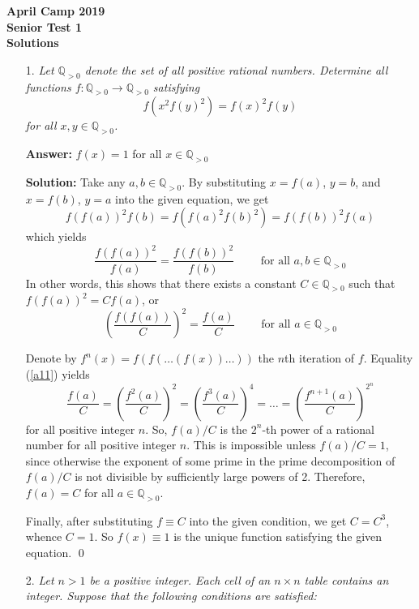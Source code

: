 \documentclass[a4paper, 12pt]{article}
\begin{document}
\begin{center}
\textbf{April Camp 2019 \\ Senior Test 1} \\
\textbf{Solutions}
\end{center}
\vspace{5mm}

\begin{enumerate}

\item[1.]  \textit{Let $\mathbb{Q}_{> 0}$ denote the set of all positive rational numbers. Determine all functions $f: \mathbb{Q}_{> 0} \to \mathbb{Q}_{> 0}$ satisfying
$$
f \left( x^2 f(y)^2\right) = f(x)^2 f(y) $$
for all $x, y \in \mathbb{Q}_{> 0}$.}
\vspace{5mm}

\textbf{Answer:} $f(x) = 1$ for all $x \in \mathbb{Q}_{> 0}$

\textbf{Solution:} Take any $a, b \in \mathbb{Q}_{> 0}$. By substituting $x = f(a)$, $y = b$, and $x = f(b)$, $y = a$ into the given equation, we get
$$ f(f(a))^2 f(b) = f(f(a)^2 f(b)^2 ) = f(f(b))^2 f(a) $$
which yields
$$
\frac{f(f(a))^2}{f(a)} = \frac{f(f(b))^2}{f(b)} \qquad \textrm{ for all } a, b \in \mathbb{Q}_{> 0}
$$
In other words, this shows that there exists a constant $C \in \mathbb{Q}_{> 0}$ such that $f(f(a))^2 = C f(a)$, or
\begin{equation}  \label{a11}
    \left( \frac{f(f(a))}{C}  \right)^2 = \frac{f(a)}{C} \qquad \textrm{ for all } a \in \mathbb{Q}_{> 0}
\end{equation}

Denote by $f^n(x) = f(f(\dots(f(x))\dots))$ the $n$th iteration of $f$. Equality (\ref{a11}) yields
$$
\frac{f(a)}{C} = \left( \frac{f^2(a)}{C}  \right)^2 = \left( \frac{f^3(a)}{C}  \right)^4 = \dots = \left( \frac{f^{n+1}(a)}{C}  \right)^{2^n}
$$
for all positive integer $n$. So, $f(a)/C$ is the $2^n$-th power of a rational number for all positive integer $n$. This is impossible unless $f(a)/C = 1$, since otherwise the exponent of some prime in the prime decomposition of $f(a)/C$ is not divisible by sufficiently large powers of 2. Therefore, $f(a) = C$ for all $a \in \mathbb{Q}_{> 0}$.

Finally, after substituting $f \equiv C$ into the given condition, we get $C = C^3$, whence $C = 1$. So $f(x) \equiv 1$ is the unique function satisfying the given equation.
\qed


\vspace{5mm}
\item[2.]  \textit{Let $n > 1$ be a positive integer. Each cell of an $n \times n$ table contains an integer. Suppose that the following conditions are satisfied:}


\end{enumerate}
\end{document}
